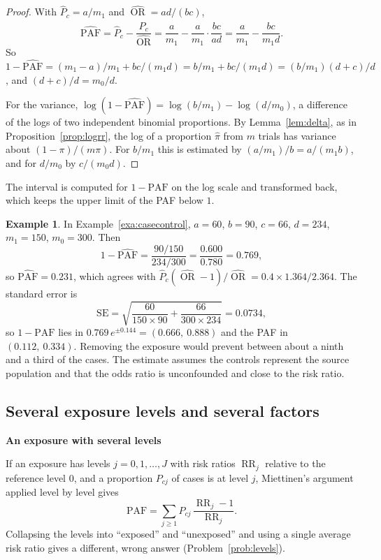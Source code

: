 \documentclass[11pt,a4paper]{article}
\numberwithin{equation}{section}
\DeclareMathOperator{\OR}{OR}
\DeclareMathOperator{\RR}{RR}
\theoremstyle{definition}
\newtheorem{exa}[thm]{Example}
\newcommand{\subhead}[1]{%
  \par\medskip\noindent\textbf{#1}\par\nobreak\smallskip}
\begin{document}
\begin{proof}
With $\hat P_c = a/m_1$ and $\widehat{\OR} = ad/(bc)$,
\[
\widehat{\text{PAF}} = \hat P_c - \frac{\hat P_c}{\widehat{\OR}} = \frac{a}{m_1} - \frac{a}{m_1} \cdot \frac{bc}{ad} = \frac{a}{m_1} - \frac{bc}{m_1 d} .
\]
So $1 - \widehat{\text{PAF}} = (m_1 - a)/m_1 + bc/(m_1 d) = b/m_1 + bc/(m_1 d) = (b/m_1)(d + c)/d$, and $(d + c)/d = m_0/d$.

For the variance, $\log(1 - \widehat{\text{PAF}}) = \log(b/m_1) - \log(d/m_0)$, a difference of the logs of two independent binomial proportions. By
Lemma~\ref{lem:delta}, as in Proposition~\ref{prop:logrr}, the log of a proportion $\hat\pi$ from $m$ trials has variance about $(1 - \pi)/(m\pi)$. For $b/m_1$
this is estimated by $(a/m_1)/b = a/(m_1 b)$, and for $d/m_0$ by $c/(m_0 d)$.
\end{proof}

The interval is computed for $1 - \text{PAF}$ on the log scale and transformed back, which keeps the upper limit of the PAF below $1$.

\begin{exa}
\label{exa:pafcc}
In Example~\ref{exa:casecontrol}, $a = 60$, $b = 90$, $c = 66$, $d = 234$, $m_1 = 150$, $m_0 = 300$. Then
\[
1 - \widehat{\text{PAF}} = \frac{90/150}{234/300} = \frac{0.600}{0.780} = 0.769 ,
\]
so $\widehat{\text{PAF}} = 0.231$, which agrees with $\hat P_c(\widehat{\OR} - 1)/\widehat{\OR} = 0.4 \times 1.364/2.364$. The standard error is
\[
\text{SE} = \sqrt{\frac{60}{150 \times 90} + \frac{66}{300 \times 234}} = 0.0734 ,
\]
so $1 - \text{PAF}$ lies in $0.769\,e^{\pm 0.144} = (0.666,\ 0.888)$ and the PAF in $(0.112,\ 0.334)$. Removing the exposure would prevent between about
a ninth and a third of the cases. The estimate assumes the controls represent the source population and that the odds ratio is
unconfounded and close to the risk ratio.
\end{exa}

\subsection{Several exposure levels and several factors}

\subhead{An exposure with several levels}

If an exposure has levels $j = 0, 1, \dots, J$ with risk ratios $\RR_j$ relative to the reference level $0$, and a proportion $P_{cj}$ of cases is at
level $j$, Miettinen's argument applied level by level gives
\[
\text{PAF} = \sum_{j \geq 1} P_{cj}\,\frac{\RR_j - 1}{\RR_j} .
\]
Collapsing the levels into ``exposed'' and ``unexposed'' and using a single average risk ratio gives a different, wrong answer
(Problem~\ref{prob:levels}).
\end{document}
